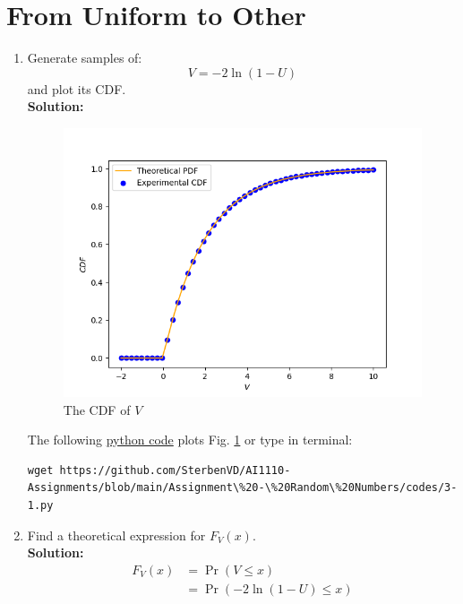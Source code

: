 \documentclass[journal,12pt,twocolumn]{IEEEtran}
\numberwithin{equation}{section}
\renewcommand\thesection{\arabic{section}}
\providecommand{\pr}[1]{\ensuremath{\Pr\left(#1\right)}}
\providecommand{\brak}[1]{\ensuremath{\left(#1\right)}}
\providecommand{\gitlink}[2]{{\color{blue}\href{https://github.com/SterbenVD/AI1110-Assignments/blob/main/Assignment\%20-\%20Random\%20Numbers/#1}{#2}}}
\newcommand{\solution}{\noindent \textbf{Solution: }}
\begin{document}
\section{From Uniform to Other}
\begin{enumerate}[label=\thesection.\arabic*,ref=\thesection.\theenumi]
    \item
          Generate samples of:
          \begin{equation}
              V = -2\ln\brak{1-U}
          \end{equation}
          and plot its CDF.
          \\
          \solution
          \begin{figure}[H]
              \centering
              \includegraphics[width = \columnwidth]{../figs/3_cdf}
              \caption{The CDF of $V$}
              \label{fig:3_cdf}
          \end{figure}
          The following \gitlink{codes/3-1.py}{python code} plots Fig. \ref{fig:3_cdf} or type in terminal:
          \begin{lstlisting}
wget https://github.com/SterbenVD/AI1110-Assignments/blob/main/Assignment\%20-\%20Random\%20Numbers/codes/3-1.py
            \end{lstlisting}
    \item Find a theoretical expression for $F_V(x)$.
          \\
          \solution
          \begin{align}
              F_V(x) & = \pr{V \leq x}
              \\
                     & = \pr{-2\ln(1-U) \leq x}

\end{align}
\end{enumerate}
\end{document}
